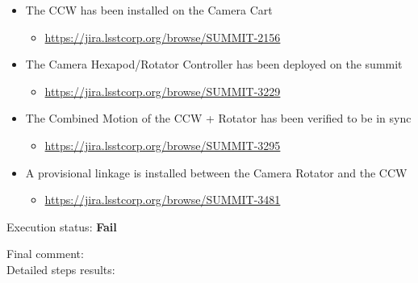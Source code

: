 \documentclass[SE,lsstdraft,STR,toc]{lsstdoc}
\providecommand{\tightlist}{
  \setlength{\itemsep}{0pt}\setlength{\parskip}{0pt}}
\begin{document}
\begin{itemize}
\tightlist
\item
  The CCW has been installed on the Camera Cart

  \begin{itemize}
  \tightlist
  \item
    \url{https://jira.lsstcorp.org/browse/SUMMIT-2156}
  \end{itemize}
\item
  The Camera Hexapod/Rotator Controller has been deployed on the summit

  \begin{itemize}
  \tightlist
  \item
    \url{https://jira.lsstcorp.org/browse/SUMMIT-3229}
  \end{itemize}
\item
  The Combined Motion of the CCW + Rotator has been verified to be in
  sync

  \begin{itemize}
  \tightlist
  \item
    \url{https://jira.lsstcorp.org/browse/SUMMIT-3295}
  \end{itemize}
\item
  A provisional linkage is installed between the Camera Rotator and the
  CCW

  \begin{itemize}
  \tightlist
  \item
    \url{https://jira.lsstcorp.org/browse/SUMMIT-3481}
  \end{itemize}
\end{itemize}


Execution status: {\bf Fail }

Final comment:\\


Detailed steps results:
\end{document}
